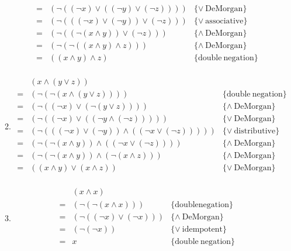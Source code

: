\documentclass{article}
\begin{document}
\begin{enumerate}
\begin{enumerate}
\[\begin{array}{lll}
            = & (\neg ((\neg x) \vee ((\neg y) \vee (\neg z)))) & \{\vee \mathrm{\ DeMorgan}\} \\
            = & (\neg (((\neg x) \vee (\neg y)) \vee (\neg z))) & \{\vee \mathrm{\ associative}\} \\
            = & (\neg ((\neg (x \wedge y)) \vee (\neg z))) & \{\wedge \mathrm{\ DeMorgan}\} \\
            = & (\neg (\neg ((x \wedge y) \wedge z))) & \{\wedge \mathrm{\ DeMorgan}\} \\
            = & ((x \wedge y) \wedge z) & \{\mathrm{double\ negation}\} \\
          \end{array} \]
        \item
          \[ \begin{array}{lll}
              & (x \wedge (y \vee z)) & \\
            = & (\neg (\neg (x \wedge (y \vee z)))) & \{\mathrm{double\ negation}\} \\
            = & (\neg ((\neg x) \vee (\neg (y \vee z)))) & \{\wedge \mathrm{\ DeMorgan}\} \\
            = & (\neg ((\neg x) \vee ((\neg y \wedge (\neg z))))) & \{\vee \mathrm{\ DeMorgan}\} \\
            = & (\neg (((\neg x)\vee (\neg y)) \wedge ((\neg x \vee (\neg z))))) & \{\vee \mathrm{\ distributive}\} \\
            = & (\neg (\neg (x \wedge y)) \wedge ((\neg x \vee (\neg z)))) & \{\wedge \mathrm{\ DeMorgan}\} \\
            = & (\neg (\neg (x \wedge y)) \wedge (\neg (x \wedge z))) & \{\wedge \mathrm{\ DeMorgan}\} \\
            = & ((x \wedge y) \vee (x \wedge z)) & \{\vee \mathrm{\ DeMorgan}\} \\
          \end{array} \]
        \item
          \[ \begin{array}{lll}
              & (x \wedge x) & \\
            = & (\neg (\neg (x \wedge x))) & \{\mathrm{double negation}\} \\
            = & (\neg ((\neg x) \vee (\neg x))) & \{\wedge \mathrm{\ DeMorgan}\} \\
            = & (\neg (\neg x)) & \{\vee \mathrm{\ idempotent}\} \\
            = & x & \{\mathrm{double\ negation}\} \\

\end{array}\]
\end{enumerate}
\end{enumerate}
\end{document}
